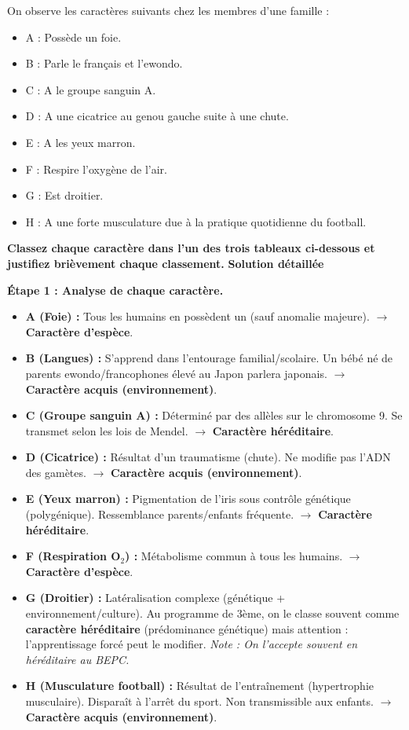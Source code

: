\documentclass[11pt]{article}
\begin{document}
\begin{exoresolu}
On observe les caractères suivants chez les membres d'une famille : 
\begin{itemize}
    \item A : Possède un foie.
    \item B : Parle le français et l'ewondo.
    \item C : A le groupe sanguin A.
    \item D : A une cicatrice au genou gauche suite à une chute.
    \item E : A les yeux marron.
    \item F : Respire l'oxygène de l'air.
    \item G : Est droitier.
    \item H : A une forte musculature due à la pratique quotidienne du football.
\end{itemize}
\textbf{Classez chaque caractère dans l'un des trois tableaux ci-dessous et justifiez brièvement chaque classement.}
\tcblower
\textbf{Solution détaillée}

\textbf{Étape 1 : Analyse de chaque caractère.}
\begin{itemize}
    \item \textbf{A (Foie) :} Tous les humains en possèdent un (sauf anomalie majeure). $\rightarrow$ \textbf{Caractère d'espèce}.
    \item \textbf{B (Langues) :} S'apprend dans l'entourage familial/scolaire. Un bébé né de parents ewondo/francophones élevé au Japon parlera japonais. $\rightarrow$ \textbf{Caractère acquis (environnement)}.
    \item \textbf{C (Groupe sanguin A) :} Déterminé par des allèles sur le chromosome 9. Se transmet selon les lois de Mendel. $\rightarrow$ \textbf{Caractère héréditaire}.
    \item \textbf{D (Cicatrice) :} Résultat d'un traumatisme (chute). Ne modifie pas l'ADN des gamètes. $\rightarrow$ \textbf{Caractère acquis (environnement)}.
    \item \textbf{E (Yeux marron) :} Pigmentation de l'iris sous contrôle génétique (polygénique). Ressemblance parents/enfants fréquente. $\rightarrow$ \textbf{Caractère héréditaire}.
    \item \textbf{F (Respiration O$_2$) :} Métabolisme commun à tous les humains. $\rightarrow$ \textbf{Caractère d'espèce}.
    \item \textbf{G (Droitier) :} Latéralisation complexe (génétique + environnement/culture). Au programme de 3ème, on le classe souvent comme \textbf{caractère héréditaire} (prédominance génétique) mais attention : l'apprentissage forcé peut le modifier. \textit{Note : On l'accepte souvent en héréditaire au BEPC.}
    \item \textbf{H (Musculature football) :} Résultat de l'entraînement (hypertrophie musculaire). Disparaît à l'arrêt du sport. Non transmissible aux enfants. $\rightarrow$ \textbf{Caractère acquis (environnement)}.
\end{itemize}


\end{exoresolu}
\end{document}
